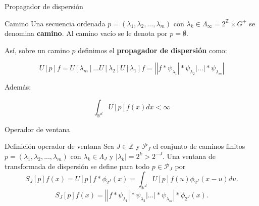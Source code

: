 \documentclass[aspectratio=43]{beamer}
\begin{document}
\begin{frame}{Propagador de dispersión}

  \begin{block}{Camino}
    Una secuencia ordenada $p=(\lambda_1,\lambda_2, \ldots , \lambda_m)$ con $\lambda_k \in \Lambda_\infty=2^{\mathbb{Z}} \times G^{+} $ se denomina \textbf{camino}. Al camino vacío se le denota por $p=\emptyset$. 
  \end{block}

  Así, sobre un camino $p$ definimos el \textbf{propagador de dispersión} como: 

  $$  U[p]f=U[\lambda_m] \ldots U[\lambda_2]U[\lambda_1]f=\left| |f \ast \psi_{\lambda_1} | \ast \psi_{\lambda_2} | \ldots | \ast \psi_{\lambda_m} \right|
  $$

  \medskip

  Además:

  $$ \int_{\mathbb{R}^d} U[p]f(x)dx < \infty $$
\end{frame}




\begin{frame}{Operador de ventana}
  \begin{block}{Definición operador de ventana}
    Sea $J \in \mathbb{Z}$ y $\mathcal{P}_J$ el conjunto de caminos finitos $p=(\lambda_1,\lambda_2,...,\lambda_m)$ con $\lambda_k \in \Lambda_J$ y $|\lambda_k|=2^{k}>2^{-J}$. Una ventana de transformada de dispersión se define para todo $p \in \mathcal{P}_J$ por
    \begin{equation*}
      S_J[p]f(x)=U[p]f \ast \phi_{2^J}(x)=\int_{\mathbb{R}^d}U[p]f(u)\phi_{2^J}(x-u)du.
    \end{equation*}
    \begin{equation*}
      S_J[p]f(x)=\left| |f \ast \psi_{\lambda_1} | \ast \psi_{\lambda_2} | \ldots | \ast \psi_{\lambda_m} \right| \ast \phi_{2^J}(x).
    \end{equation*}
  \end{block}
\end{frame}
\end{document}
